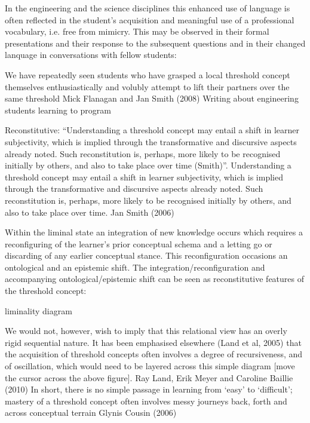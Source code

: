 \documentclass{tufte-book}\usepackage[]{graphicx}\usepackage[]{xcolor}
\begin{document}
In the engineering and the science disciplines this enhanced use of language is often reflected in the student’s acquisition and meaningful use of a professional vocabulary, i.e. free from mimicry. This may be observed in their formal presentations and their response to the subsequent questions and in their changed lanquage in conversations with fellow students:

We have repeatedly seen students who have grasped a local threshold concept themselves enthusiastically and volubly attempt to lift their partners over the same threshold
                              Mick Flanagan and Jan Smith (2008)
                              Writing about engineering students learning to program

Reconstitutive: ``Understanding a threshold concept may entail a shift in learner subjectivity, which is implied through the transformative and discursive aspects already noted. Such reconstitution is, perhaps, more likely to be recognised initially by others, and also to take place over time (Smith)''.  Understanding a threshold concept may entail a shift in learner subjectivity, which is implied through the transformative and discursive aspects already noted. Such reconstitution is, perhaps, more likely to be recognised initially by others, and also to take place over time.
                                                                                              Jan Smith (2006)

Within the liminal state an integration of new knowledge occurs which requires a reconfiguring of the learner’s prior conceptual schema and a letting go or discarding of any earlier conceptual stance. This reconfiguration occasions an ontological and an epistemic shift. The integration/reconfiguration and accompanying ontological/epistemic shift can be seen as reconstitutive features of the threshold concept:

 liminality diagram



We would not, however, wish to imply that this relational view has an overly rigid sequential nature. It has been emphasised elsewhere (Land et al, 2005) that the acquisition of threshold concepts often involves a degree of recursiveness, and of oscillation, which would need to be layered across this simple diagram [move the cursor across the above figure].
                                                    Ray Land, Erik Meyer and Caroline Baillie (2010)
In short, there is no simple passage in learning from ‘easy’ to ‘difficult’; mastery of a threshold concept often involves messy journeys back, forth and across conceptual terrain
                                                                                              Glynis Cousin (2006)
\end{document}
